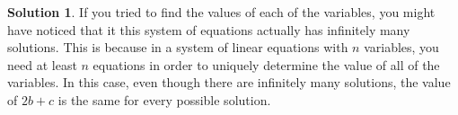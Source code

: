 \documentclass{article}
\theoremstyle{definition}
\newtheorem*{solution}{Solution}
\begin{document}
\begin{enumerate}
\begin{solution}
            If you tried to find the values of each of the variables, you might
            have noticed that it this system of equations actually has
            infinitely many solutions. This is because in a system of linear
            equations with $n$ variables, you need at least $n$ equations in
            order to uniquely determine the value of all of the variables. In
            this case, even though there are infinitely many solutions, the
            value of $2b + c$ is the same for every possible solution.
        \end{solution}
    \end{enumerate}
\end{document}
